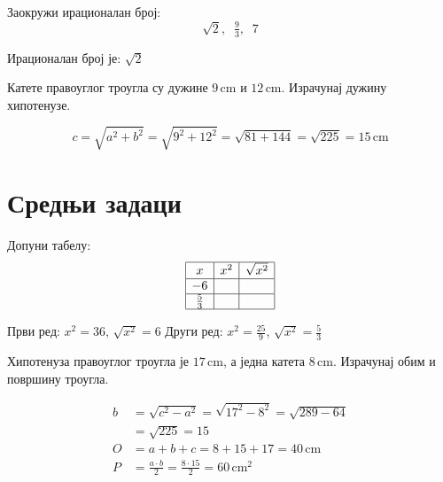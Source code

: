 \documentclass[11pt,a5paper,twoside,addpoints,noanswers]{exam} %
\newcommand{\measure}[2]{\mathrm{#1\,#2}}
\newcommand{\variant}[3]{#1}
\begin{document}
\begin{questions}
\question[2]
Заокружи ирационалан број:  
$$
\variant{\sqrt{2},\;\;\tfrac{9}{3},\;\;7}{-5,\;\;\sqrt{18},\;\;2}{\tfrac{4}{5},\;\;\sqrt{5},\;\;1,\!2}
$$
\begin{solution}[\stretch 1]
Ирационалан број је:  
\variant{$\sqrt{2}$}{$\sqrt{18}$}{$\sqrt{5}$}
\end{solution}

\question[3]
Катете правоуглог троугла су дужине
$\measure{\variant{9}{12}{8}}{cm}$ и
$\measure{\variant{12}{5}{15}}{cm}$.  
Израчунај дужину хипотенузе.
\begin{solution}[\stretch 2]
\[
c=\sqrt{a^2+b^2}=\sqrt{\variant{9^2+12^2}{12^2+5^2}{8^2+15^2}}
=\sqrt{\variant{81+144}{144+25}{64+225}}
=\sqrt{\variant{225}{169}{289}}
=\measure{\variant{15}{13}{17}}{cm}
\]
\end{solution}

\section{Средњи задаци}

\question[4]
Допуни табелу:
$$
\begin{array}{|c|c|c|}\hline
x & x^2 & \sqrt{x^2}\\\hline
\variant{-6}{\tfrac{3}{2}}{-4} & & \\\hline
\variant{\tfrac{5}{3}}{-2}{1,\!7} & & \\\hline
\end{array}
$$
\begin{solution}[\stretch 2]
Први ред: $x^2=\variant{36}{\tfrac{9}{4}}{16}$, $\sqrt{x^2}=\variant{6}{\tfrac{3}{2}}{4}$  
Други ред: $x^2=\variant{\tfrac{25}{9}}{4}{2,\!89}$, $\sqrt{x^2}=\variant{\tfrac{5}{3}}{2}{1,\!7}$
\end{solution}

\question[4]
Хипотенуза правоуглог троугла је
$\measure{\variant{17}{20}{25}}{cm}$, а једна катета
$\measure{\variant{8}{12}{15}}{cm}$.  
Израчунај обим и површину троугла.
\begin{solution}[\stretch 4]
\begin{align*}
b &= \sqrt{c^2-a^2} = \sqrt{\variant{17^2-8^2}{20^2-12^2}{25^2-15^2}}
= \sqrt{\variant{289-64}{400-144}{625-225}}\\
&= \sqrt{\variant{225}{256}{400}}=\variant{15}{16}{20}\\
O &= a+b+c = \variant{8+15+17}{12+16+20}{15+20+25}
=\measure{\variant{40}{48}{60}}{cm}\\
P &= \tfrac{a\cdot b}{2}=\tfrac{\variant{8\cdot15}{12\cdot16}{15\cdot20}}{2}
=\measure{\variant{60}{96}{150}}{cm^2}
\end{align*}
\end{solution}


\end{questions}
\end{document}
